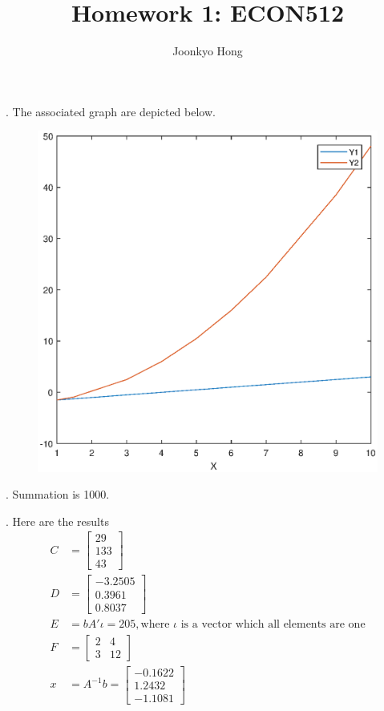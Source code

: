 \documentclass[10pt, letterpaper]{article}
\begin{document}
\title{Homework 1: ECON512}
\author{Joonkyo Hong}
\date{}
\maketitle
\smallskip

. The associated graph are depicted below.

\begin{figure}[!h]
\begin{center}
  \includegraphics[width=0.4\linewidth]{graph1.eps}
  \caption{}
  \label{fig:graph}
\end{center}
\end{figure}

. Summation is 1000.

. Here are the results 
\begin{align}
C & = \begin{bmatrix}
         29 \\ 133 \\ 43
      \end{bmatrix}    \nonumber \\
D & = \begin{bmatrix}
        -3.2505 \\ 0.3961 \\ 0.8037 
       \end{bmatrix}    \nonumber \\
E & = b A' \iota = 205, \text{where $\iota$ is a vector which all elements are one} \nonumber \\
F & = \begin{bmatrix}
          2 & 4 \\
          3 & 12 
      \end{bmatrix} \nonumber \\
x & = A^{-1}b = \begin{bmatrix}
                  -0.1622 \\ 1.2432 \\ -1.1081
                 \end{bmatrix} \nonumber 
\end{align}
\end{document}
